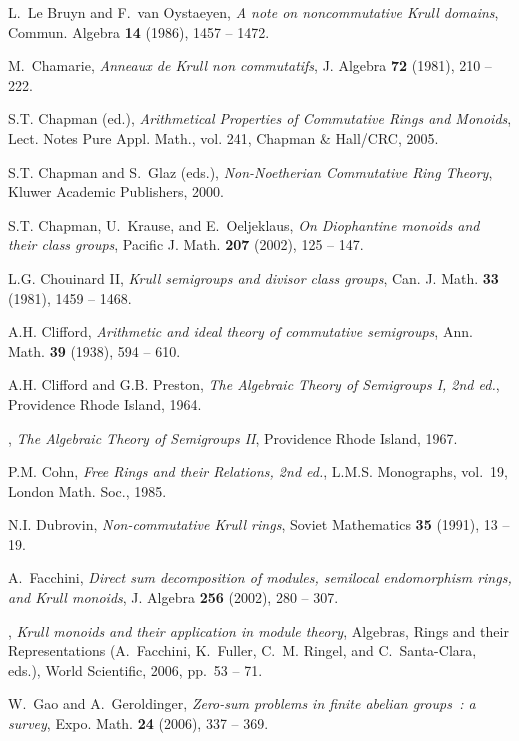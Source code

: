 \documentclass[a4paper]{amsart}
\theoremstyle{definition}
\numberwithin{equation}{section}
\begin{document}
\begin{thebibliography}{10}
L.~Le Bruyn and F.~van Oystaeyen, \emph{A note on noncommutative {K}rull
  domains}, Commun. Algebra \textbf{14} (1986), 1457 -- 1472.

M.~Chamarie, \emph{Anneaux de {K}rull non commutatifs}, J. Algebra \textbf{72}
  (1981), 210 -- 222.

S.T. Chapman (ed.), \emph{Arithmetical {P}roperties of {C}ommutative {R}ings
  and {M}onoids}, Lect. Notes Pure Appl. Math., vol. 241, Chapman \& Hall/CRC,
  2005.

S.T. Chapman and S.~Glaz (eds.), \emph{Non-{N}oetherian {C}ommutative {R}ing
  {T}heory}, Kluwer {A}cademic {P}ublishers, 2000.

S.T. Chapman, U.~Krause, and E.~Oeljeklaus, \emph{On {D}iophantine monoids and
  their class groups}, Pacific J. Math. \textbf{207} (2002), 125 -- 147.

L.G. {Chouinard II}, \emph{{K}rull semigroups and divisor class groups}, Can.
  J. Math. \textbf{33} (1981), 1459 -- 1468.

A.H. Clifford, \emph{Arithmetic and ideal theory of commutative semigroups},
  Ann. Math. \textbf{39} (1938), 594 -- 610.

A.H. Clifford and G.B. Preston, \emph{The {A}lgebraic {T}heory of {S}emigroups
  {I}, 2nd ed.}, Providence Rhode Island, 1964.

\bysame, \emph{The {A}lgebraic {T}heory of {S}emigroups {II}}, Providence Rhode
  Island, 1967.

P.M. Cohn, \emph{Free {R}ings and their {R}elations, 2nd ed.}, L.M.S.
  Monographs, vol.~19, London Math. Soc., 1985.

N.I. Dubrovin, \emph{Non-commutative {K}rull rings}, Soviet Mathematics
  \textbf{35} (1991), 13 -- 19.

A.~Facchini, \emph{Direct sum decomposition of modules, semilocal endomorphism
  rings, and {K}rull monoids}, J. Algebra \textbf{256} (2002), 280 -- 307.

\bysame, \emph{Krull monoids and their application in module theory}, Algebras,
  {R}ings and their {R}epresentations (A.~Facchini, K.~Fuller, C.~M. Ringel,
  and C.~Santa-Clara, eds.), World Scientific, 2006, pp.~53 -- 71.

W.~Gao and A.~Geroldinger, \emph{Zero-sum problems in finite abelian groups{\rm
  \,:} a survey}, Expo. Math. \textbf{24} (2006), 337 -- 369.


\end{thebibliography}
\end{document}
